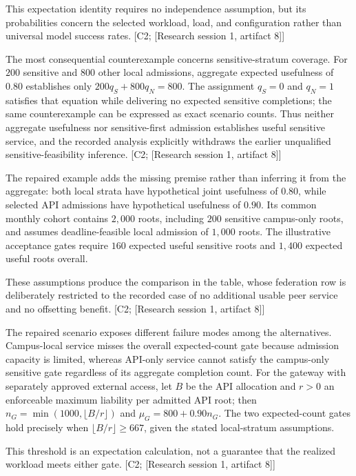 \documentclass[11pt]{article}
\begin{document}
This expectation identity requires no independence assumption, but its probabilities concern the selected workload, load, and configuration rather than universal model success rates. [C2; [Research session 1, artifact 8]]

The most consequential counterexample concerns sensitive-stratum coverage. For $200$ sensitive and $800$ other local admissions, aggregate expected usefulness of $0.80$ establishes only $200q_S+800q_N=800$. The assignment $q_S=0$ and $q_N=1$ satisfies that equation while delivering no expected sensitive completions; the same counterexample can be expressed as exact scenario counts. Thus neither aggregate usefulness nor sensitive-first admission establishes useful sensitive service, and the recorded analysis explicitly withdraws the earlier unqualified sensitive-feasibility inference. [C2; [Research session 1, artifact 8]]

The repaired example adds the missing premise rather than inferring it from the aggregate: both local strata have hypothetical joint usefulness of $0.80$, while selected API admissions have hypothetical usefulness of $0.90$. Its common monthly cohort contains $2{,}000$ roots, including $200$ sensitive campus-only roots, and assumes deadline-feasible local admission of $1{,}000$ roots. The illustrative acceptance gates require $160$ expected useful sensitive roots and $1{,}400$ expected useful roots overall.

These assumptions produce the comparison in the table, whose federation row is deliberately restricted to the recorded case of no additional usable peer service and no offsetting benefit. [C2; [Research session 1, artifact 8]]

The repaired scenario exposes different failure modes among the alternatives. Campus-local service misses the overall expected-count gate because admission capacity is limited, whereas API-only service cannot satisfy the campus-only sensitive gate regardless of its aggregate completion count. For the gateway with separately approved external access, let $B$ be the API allocation and $r>0$ an enforceable maximum liability per admitted API root; then $n_G=\min(1000,\lfloor B/r\rfloor)$ and $\mu_G=800+0.90n_G$. The two expected-count gates hold precisely when $\lfloor B/r\rfloor\geq667$, given the stated local-stratum assumptions.

This threshold is an expectation calculation, not a guarantee that the realized workload meets either gate. [C2; [Research session 1, artifact 8]]
\end{document}
